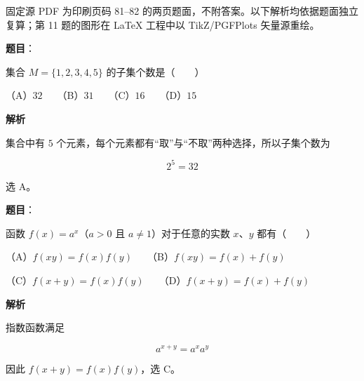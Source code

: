 

\begin{gktip}
固定源 PDF 为印刷页码 81–82 的两页题面，不附答案。以下解析均依据题面独立复算；第 11 题的图形在 LaTeX 工程中以 TikZ/PGFPlots 矢量源重绘。
\end{gktip}


\begin{answer}

\textbf{题目}：

集合 $M=\{1,2,3,4,5\}$ 的子集个数是\mbox{（　　）}

（A）$32$　　（B）$31$　　（C）$16$　　（D）$15$

\textbf{解析}

集合中有 $5$ 个元素，每个元素都有“取”与“不取”两种选择，所以子集个数为

\nopagebreak[4]
\[
2^5=32
\]

选 A。


\end{answer}
\begin{answer}

\textbf{题目}：

函数 $f(x)=a^x$（$a>0$ 且 $a\ne1$）对于任意的实数 $x\text{、}y$ 都有\mbox{（　　）}

（A）$f(xy)=f(x)f(y)$　　（B）$f(xy)=f(x)+f(y)$

（C）$f(x+y)=f(x)f(y)$　　（D）$f(x+y)=f(x)+f(y)$

\textbf{解析}

指数函数满足

\nopagebreak[4]
\[
a^{x+y}=a^xa^y
\]

因此 $f(x+y)=f(x)f(y)$，选 C。


\end{answer}
